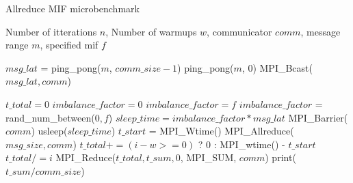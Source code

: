 \begin{algorithm}
  \caption{Allreduce MIF microbenchmark}
  \label{alg:mif_microbmark}
  \begin{algorithmic}[1]
    \Require Number of itterations $n$, Number of warmups $w$, communicator $comm$, message range $m$, specified mif $f$
    
            \State $msg\_lat$ = ping\_pong($m$, $comm\_size - 1$)
            \State ping\_pong($m$, 0)
        \EndIf
        \State MPI\_Bcast($msg\_lat, comm$) 
        
        \State $t\_total = 0$
                \State $imbalance\_factor = 0$ 
                \State $imbalance\_factor = f$
            \Else
                \State $imbalance\_factor$ = rand\_num\_between($0, f$) 
            \EndIf
            \State $sleep\_time = imbalance\_factor * msg\_lat$
            \State MPI\_Barrier($comm$)
            \State usleep($sleep\_time$) 
            \State $t\_start$ = MPI\_Wtime()
            \State MPI\_Allreduce($msg\_size, comm$)
            \State $t\_total += (i-w >= 0)$ ? 0 : MPI\_wtime() - $t\_start$
        \EndFor
        \State $t\_total /= i$
        \State MPI\_Reduce($t\_total, t\_sum, 0$, MPI\_SUM, $comm$)
        \State print($t\_sum / comm\_size$)
    \EndFor
  \end{algorithmic}
\end{algorithm}